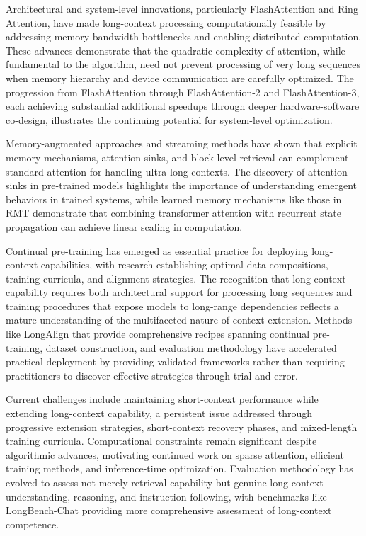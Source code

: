 Architectural and system-level innovations, particularly FlashAttention and Ring Attention, have made long-context processing computationally feasible by addressing memory bandwidth bottlenecks and enabling distributed computation. These advances demonstrate that the quadratic complexity of attention, while fundamental to the algorithm, need not prevent processing of very long sequences when memory hierarchy and device communication are carefully optimized. The progression from FlashAttention through FlashAttention-2 and FlashAttention-3, each achieving substantial additional speedups through deeper hardware-software co-design, illustrates the continuing potential for system-level optimization.

Memory-augmented approaches and streaming methods have shown that explicit memory mechanisms, attention sinks, and block-level retrieval can complement standard attention for handling ultra-long contexts. The discovery of attention sinks in pre-trained models highlights the importance of understanding emergent behaviors in trained systems, while learned memory mechanisms like those in RMT demonstrate that combining transformer attention with recurrent state propagation can achieve linear scaling in computation.

Continual pre-training has emerged as essential practice for deploying long-context capabilities, with research establishing optimal data compositions, training curricula, and alignment strategies. The recognition that long-context capability requires both architectural support for processing long sequences and training procedures that expose models to long-range dependencies reflects a mature understanding of the multifaceted nature of context extension. Methods like LongAlign that provide comprehensive recipes spanning continual pre-training, dataset construction, and evaluation methodology have accelerated practical deployment by providing validated frameworks rather than requiring practitioners to discover effective strategies through trial and error.

Current challenges include maintaining short-context performance while extending long-context capability, a persistent issue addressed through progressive extension strategies, short-context recovery phases, and mixed-length training curricula. Computational constraints remain significant despite algorithmic advances, motivating continued work on sparse attention, efficient training methods, and inference-time optimization. Evaluation methodology has evolved to assess not merely retrieval capability but genuine long-context understanding, reasoning, and instruction following, with benchmarks like LongBench-Chat providing more comprehensive assessment of long-context competence.

